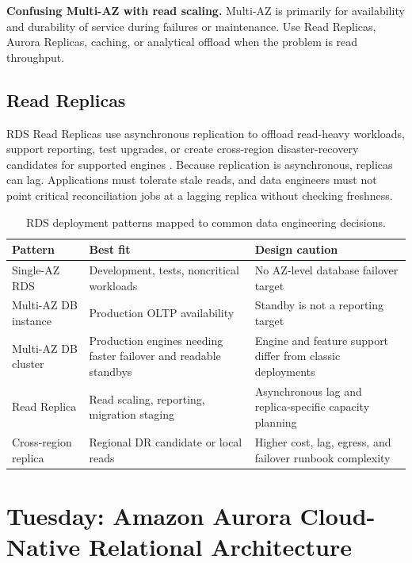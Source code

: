 \begin{pitfall}
\textbf{Confusing Multi-AZ with read scaling.} Multi-AZ is primarily for availability and durability of service during failures or maintenance. Use Read Replicas, Aurora Replicas, caching, or analytical offload when the problem is read throughput.
\end{pitfall}

\subsection{Read Replicas}
RDS Read Replicas use asynchronous replication to offload read-heavy workloads, support reporting, test upgrades, or create cross-region disaster-recovery candidates for supported engines \cite{awsRDSReadReplicas}. Because replication is asynchronous, replicas can lag. Applications must tolerate stale reads, and data engineers must not point critical reconciliation jobs at a lagging replica without checking freshness.

\begin{table}[H]
\centering
\small
\begin{tabular}{@{}p{3.2cm}p{4.5cm}p{5.0cm}@{}}
\toprule
\textbf{Pattern} & \textbf{Best fit} & \textbf{Design caution} \\
\midrule
Single-AZ RDS & Development, tests, noncritical workloads & No AZ-level database failover target \\
Multi-AZ DB instance & Production OLTP availability & Standby is not a reporting target \\
Multi-AZ DB cluster & Production engines needing faster failover and readable standbys & Engine and feature support differ from classic deployments \\
Read Replica & Read scaling, reporting, migration staging & Asynchronous lag and replica-specific capacity planning \\
Cross-region replica & Regional DR candidate or local reads & Higher cost, lag, egress, and failover runbook complexity \\
\bottomrule
\end{tabular}
\caption{RDS deployment patterns mapped to common data engineering decisions.}
\label{tab:rds-patterns}
\end{table}

\section{Tuesday: Amazon Aurora Cloud-Native Relational Architecture}
